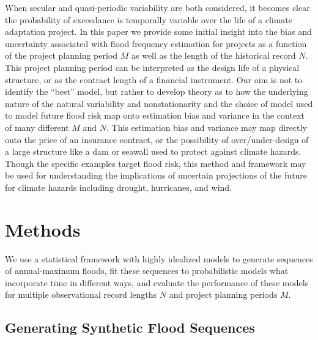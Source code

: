 \documentclass[12pt]{article}
\begin{document}
When secular and quasi-periodic variability are both considered, it becomes clear the probability of exceedance is temporally variable over the life of a climate adaptation project.
In this paper we provide some initial insight into the bias and uncertainty associated with flood frequency estimation for projects as a function of the project planning period $M$ as well as the length of the historical record $N$.
This project planning period can be interpreted as the design life of a physical structure, or as the contract length of a financial instrument.
Our aim is not to identify the ``best'' model, but rather to develop theory as to how the underlying nature of the natural variability and nonstationarity and the choice of model used to model future flood risk map onto estimation bias and variance in the context of many different $M$ and $N$.
This estimation bias and variance may map directly onto the price of an insurance contract, or the possibility of over/under-design of a large structure like a dam or seawall used to protect against climate hazards.
Though the specific examples target flood risk, this method and framework may be used for understanding the implications of uncertain projections of the future for climate hazards including drought, hurricanes, and wind.


\section{Methods}\label{sec:methods}

We use a statistical framework with highly idealized models to generate sequences of annual-maximum floods, fit these sequences to probabilistic models what incorporate time in different ways, and evaluate the performance of these models for multiple observational record lengths $N$ and project planning periods $M$.

\subsection{Generating Synthetic Flood Sequences\label{sec:methods-generating}}
\end{document}
